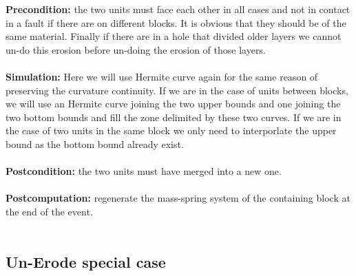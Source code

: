 \documentclass[12pt, a4paper]{memoir} %
\begin{document}
\textbf{Precondition:} the two units must face each other in all cases and not in contact in a fault if there are on different blocks. It is obvious that they should be of the same material. Finally if there are in a hole that divided older layers we cannot un-do this erosion before un-doing the erosion of those layers.\\\\
\textbf{Simulation:} Here we will use Hermite curve again for the same reason of preserving the curvature continuity. If we are in the case of units between blocks, we will use an Hermite curve joining the two upper bounds and one joining the two bottom bounds and fill the zone delimited by these two curves. If we are in the case of two units in the same block we only need to interporlate the upper bound as the bottom bound already exist.\\\\
\textbf{Postcondition:} the two units must have merged into a new one.\\\\
\textbf{Postcomputation:} regenerate the mass-spring system of the containing block at the end of the event.\\\\
\subsection{Un-Erode special case}
\end{document}
